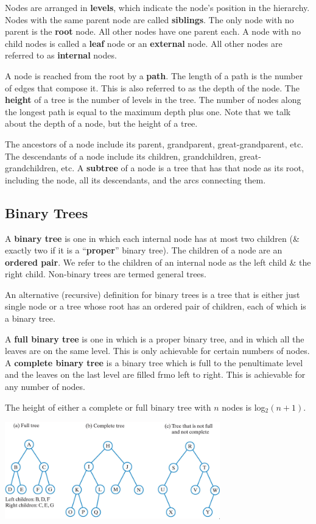 \documentclass[11pt]{article}
\begin{document}
Nodes are arranged in \textbf{levels}, which indicate the node's position in the hierarchy. 
Nodes with the same parent node are called \textbf{siblings}. 
The only node with no parent is the \textbf{root} node.  
All other nodes have one parent each.
A node with no child nodes is called a \textbf{leaf} node or an \textbf{external} node.
All other nodes are referred to as \textbf{internal} nodes.

A node is reached from the root by a \textbf{path}. 
The length of a path is the number of edges that compose it. 
This is also referred to as the depth of the node.
The \textbf{height} of a tree is the number of levels in the tree. 
The number of nodes along the longest path is equal to the maximum depth plus one.
Note that we talk about the depth of a node, but the height of a tree.

The ancestors of a node include its parent, grandparent, great-grandparent, etc.
The descendants of a node include its children, grandchildren, great-grandchildren, etc.
A \textbf{subtree} of a node is a tree that has that node as its root, including the node, all its descendants, and the arcs connecting them.

\subsection{Binary Trees}
A \textbf{binary tree} is one in which each internal node has at most two children (\& exactly two if it is a ``\textbf{proper}'' binary tree). 
The children of a node are an \textbf{ordered pair}.
We refer to the children of an internal node as the left child \& the right child.
Non-binary trees are termed general trees.

An alternative (recursive) definition for binary trees is a tree that is either just single node or a tree whose root has an ordered pair of children, each of which is a binary tree.

A \textbf{full binary tree} is one in which is a proper binary tree, and in which all the leaves are on the same level.
This is only achievable for certain numbers of nodes.
A \textbf{complete binary tree} is a binary tree which is full to the penultimate level and the leaves on the last level are filled frmo left to right.
This is achievable for any number of nodes.

The height of either a complete or full binary tree with $n$ nodes is log$_2(n+1)$. 

\begin{center}
    \includegraphics[width=0.7\textwidth]{binarytrees.png}
\end{center}
\end{document}
